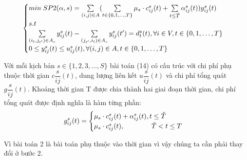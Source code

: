 \documentclass[a4paper]{article}
\begin{document}
    \begin{gather}
        \begin{cases}
            min \; SP2(\alpha, s) = \sum\limits_{(i,j) \in A} (\sum\limits_{t \in \{0,1, \dotsc, T\}} \mu_s \cdot c_{ij}^s(t) + \sum\limits_{t \leq \Tilde{T}} \alpha_{ij}^s(t))y_{ij}^s(t)\\
            s.t\\
            \sum\limits_{(i_t,j_{t'}) \in A_s} y_{ij}^s(t) - \sum\limits_{(j_{t'},i_t) \in A_s} y_{ij}^s(t') = d_t^s(t), \forall i \in V, t \in \{0,1, \dotsc, T\}\\
            0 \leq y_{ij}^s(t) \leq u_{ij}^s(t), \forall (i,j) \in A, t \in \{0,1, \dotsc, T\}\\
        \end{cases}
    \end{gather}

    Với mỗi kịch bản $s \in \{1,2,3,\dotsc,S\}$ bài toán (14) có cấu trúc với chi phí phụ thuộc thời gian
    $c\dfrac{s}{ij}(t)$, dung lượng liên kết $u\dfrac{s}{ij}(t)$ và chi phí tổng quát
    $g\dfrac{s}{ij}(t)$. Khoảng thời gian T được chia thành hai giai đoạn thời gian, chi phí tổng quát được định nghĩa là hàm từng phần:
    \begin{displaymath}
        g_{ij}^s(t) = \begin{cases}
            \mu_s \cdot c_{ij}^s(t) + \alpha_{ij}^s(t), t \leq \Tilde{T}\\
            \mu_s \cdot c_{ij}^s(t), \quad \quad \quad \quad\Tilde{T} < t \leq T\\
        \end{cases}
    \end{displaymath}

    Vì bài toán 2 là bài toán phụ thuộc vào thời gian vì vậy chúng ta cần phải thay đổi ở bước 2.
\end{document}

